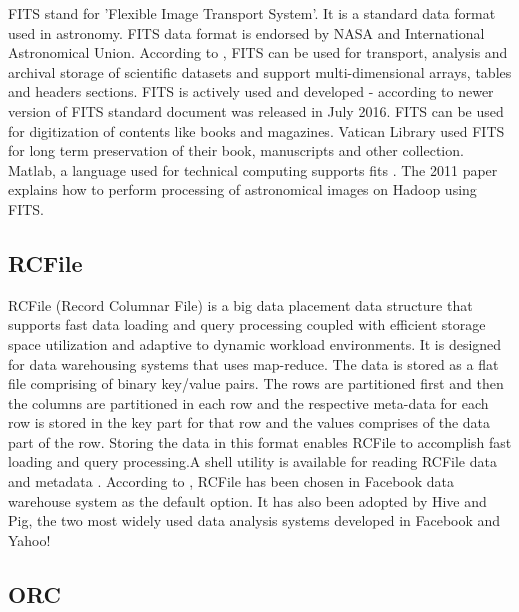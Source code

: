      FITS stand for 'Flexible Image Transport System'. It is a
     standard data format used in astronomy. FITS data format is
     endorsed by NASA and International Astronomical Union. According
     to \cite{www-fits-nasa}, FITS can be used for transport,
     analysis and archival storage of scientific datasets and support
     multi-dimensional arrays, tables and headers sections.  FITS is
     actively used and developed - according to
     \cite{www-news-fits-2016} newer version of FITS standard
     document was released in July 2016. FITS can be used for
     digitization of contents like books and
     magazines. Vatican Library \cite{www-fits-vatican-library} used FITS 
     for long term preservation of their book, manuscripts and other
     collection. Matlab, a language used for technical computing
     supports fits \cite{www-fits-matlab}. The 2011 paper
     \cite{paper-fits-2011} explains how to perform
     processing of astronomical images on Hadoop using FITS. 

\subsection{RCFile}

     RCFile (Record Columnar File) \cite{www-rcfile-wiki} is a big
     data placement data structure that supports fast data loading and
     query processing coupled with efficient storage space utilization
     and adaptive to dynamic workload environments. It is designed for
     data warehousing systems that uses map-reduce. The data is stored
     as a flat file comprising of binary key/value pairs. The rows are
     partitioned first and then the columns are partitioned in each
     row and the respective meta-data for each row is stored in the
     key part for that row and the values comprises of the data part
     of the row. Storing the data in this format enables RCFile to
     accomplish fast loading and query processing.A shell utility is
     available for reading RCFile data and metadata
     \cite{www-rcfile-cat}. According to \cite{he2011rcfile}, RCFile has
     been chosen in Facebook data warehouse system as the default
     option. It has also been adopted by Hive and Pig, the two most
     widely used data analysis systems developed in Facebook and
     Yahoo!

\subsection{ORC}

